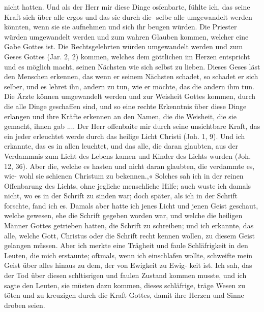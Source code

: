 nicht hatten. Und als der Herr mir diese Dinge osfenbarte, fühlte
ich, das seine Kraft sich über alle ergos und das sie durch die-
selbe alle umgewandelt werden könnten, wenn sie sie aufnehmen und
sich ihr beugen würden. Die Priester würden umgewandelt werden
und zum wahren Glauben kommen, welcher eine Gabe Gottes
ist. Die Rechtsgelehrten würden umgewandelt werden und zum
Geses Gottes (Jar. 2, 2) kommen, welches dem göttlichen im
Herzen entspricht und es möglich macht, seinen Nächsten wie sich
selbst zu lieben. Dieses Geses läst den Menschen erkennen, das
wenn er seinem Nächsten schadet, so schadet er sich selber, und
es lehret ihn, andern zu tun, wie er möchte, das die andern ihm
tun. Die Ärzte können umgewandelt werden und zur Weisheit
Gottes kommen, durch die alle Dinge geschaffen sind, und so
eine rechte Erkenntnis über diese Dinge erlangen und ihre Kräfte
erkennen an den Namen, die die Weisheit, die sie gemacht, ihnen
gab ....
Der Herr offenbaite mir durch seine unsichtbare Kraft, das
ein jeder erleuchtet werde durch das heilige Licht Christi (Joh. 1, 9).
Und ich erkannte, das es in allen leuchtet, und das alle, die
daran glaubten, aus der Verdammnis zum Licht des Lebens
kamen und Kinder des Lichts wurden (Joh. 12, 36). Aber die,
welche es hasten und nicht daran glaubten, die verdammte es, wie-
wohl sie schienen Christum zu bekennen.,« Solches sah ich in der
reinen Offenbarung des Lichts, ohne jegliche menschliche Hilfe;
auch wuste ich damals nicht, wo es in der Schrift zu sinden
war; doch später, als ich in der Schrift forschte, fand ich es.
Damals aber hatte ich jenes Licht und jenen Geist geschaut, welche
gewesen, ehe die Schrift gegeben worden war, und welche die
heiligen Männer Gottes getrieben hatten, die Schrift zu schreiben;
und ich erkannte, das alle, welche Gott, Christus oder die Schrift
recht kennen wollen, zu diesem Geist gelangen müssen. Aber ich
merkte eine Trägheit und faule Schläfrigkeit in den Leuten, die
mich erstaunte; oftmals, wenn ich einschlafen wollte, schweifte
mein Geist über alles hinaus zu dem, der von Ewigkeit zu Ewig-
keit ist. Ich sah, das der Tod über diesen schltisrigen und faulen
Zustand kommen musste, und ich sagte den Leuten, sie müsten
dazu kommen, dieses schläfrige, träge Wesen zu töten und zu
kreuzigen durch die Kraft Gottes, damit ihre Herzen und Sinne
droben seien.


